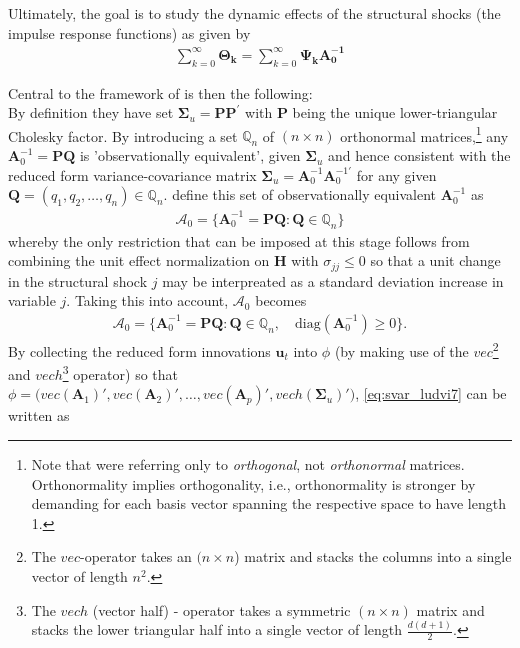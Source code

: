 \documentclass[a4paper,11pt,listof=nochaptergap,oneside,pointednumbers,bibtotoc,bigheadings,liststotoc]{scrbook}
\theoremstyle{mysatz}
\theoremstyle{mydefinition}
\theoremstyle{mybemerkung}
\newcommand{\vect}[1]{\boldsymbol{\mathbf{#1}}}
\begin{document}
Ultimately, the goal is to study the dynamic effects of the structural shocks (the impulse response functions) as given by
\begin{equation} \label{eq:svar_ludvi5}
\begin{split}
 			\sum\limits_{k=0}^\infty \vect{\Theta_k} = \sum\limits_{k=0}^\infty \vect{\Psi_k}\vect{A_0^{-1}}
\end{split}								
\end{equation}

Central to the framework of \citet{ludvigsonetal:18} is then the following: \\
By definition they have set $\vect{\Sigma}_u = \vect{P}\vect{P}^'$ with $\vect{P}$ being the unique lower-triangular Cholesky factor. By introducing a set $\mathbb{Q}_n$ of $(n \times n)$ orthonormal matrices,\footnote{Note that \citet{rubioetal:10} were referring only to \textit{orthogonal}, not \textit{orthonormal} matrices. Orthonormality implies orthogonality, i.e., orthonormality is stronger by demanding for each basis vector spanning the respective space to have length 1.} any $\vect{A}_0^{-1} = \vect{P}\vect{Q}$ is 'observationally equivalent', given $\vect{\Sigma}_u$ and hence consistent with the reduced form variance-covariance matrix $\vect{\Sigma}_u = \vect{A}_0^{-1}\vect{A}_0^{-1'}$ for any given $\vect{Q} = (q_1, q_2, \dots, q_n) \in \mathbb{Q}_n$. \citet{ludvigsonetal:18} define this set of observationally equivalent $\vect{A}_0^{-1}$ as 
\begin{equation} \label{eq:svar_ludvi6}
\begin{split}
 			\mathcal{A}_0 = \{\vect{A}_0^{-1} = \vect{P}\vect{Q}: \vect{Q} \in \mathbb{Q}_n\}
\end{split}								
\end{equation}
whereby the only restriction that can be imposed at this stage follows from combining the unit effect normalization on $\vect{H}$ with $\sigma_{jj} \leq 0$ so that a unit change in the structural shock $j$ may be interpreated as a standard deviation increase in variable $j$. Taking this into account, $\mathcal{A}_0$ becomes
\begin{equation} \label{eq:svar_ludvi7}
\begin{split}
 			\vect{\mathcal{A}}_0 = \{\vect{A}_0^{-1} = \vect{P}\vect{Q}: \vect{Q} \in \mathbb{Q}_n, \quad \text{diag}(\vect{A}_0^{-1}) \geq 0\}.
\end{split}								
\end{equation}
By collecting the reduced form innovations $\vect{u}_t$ into $\phi$ (by making use of the $vec$\footnote{The $vec$-operator takes an $(n \times n$) matrix and stacks the columns into a single vector of length $n^2$.} and $vech$\footnote{The $vech$ (vector half) - operator takes a symmetric $(n \times n)$ matrix and stacks the lower triangular half into a single vector of length $\frac{d(d+1)}{2}$.} operator) so that $\phi = \Big(vec(\vect{A}_1)', vec(\vect{A}_2)', \dots, vec(\vect{A}_p)', vech(\vect{\Sigma}_u)'\Big)$, \ref{eq:svar_ludvi7} can be written as 
\end{document}
